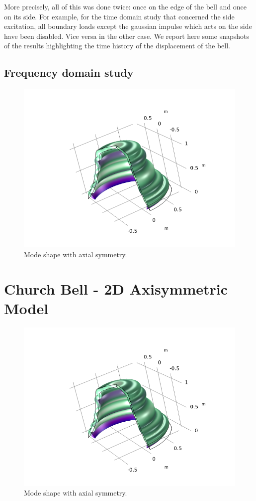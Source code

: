 \documentclass[a4paper]{article}
\begin{document}
More precisely, all of this was done twice: once on the edge of the bell and once on its side. For example, for the time domain study that concerned the side excitation, all boundary loads except the gaussian impulse which acts on the side have been disabled. Vice versa in the other case. We report here some snapshots of the results highlighting the time history of the displacement of the bell. 

\subsection{Frequency domain study}

\begin{figure}[h!]
	\centering\includegraphics[width=0.75\linewidth]{axisMode.png}
	\caption{Mode shape with axial symmetry.}
	\label{fig:ax}
\end{figure}

\section{Church Bell - 2D Axisymmetric Model}

\begin{figure}[h!]
	\centering\includegraphics[width=0.75\linewidth]{axisMode.png}
	\caption{Mode shape with axial symmetry.}
	\label{fig:ax}
\end{figure}
\end{document}
